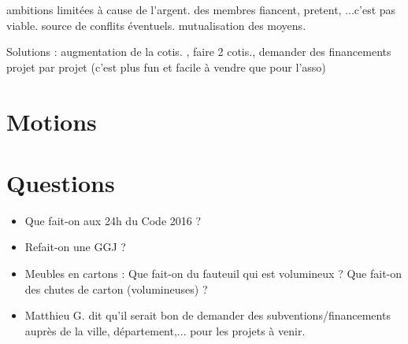 \documentclass[11pt]{article}
\begin{document}
ambitions limitées à cause de l'argent. des membres fiancent, pretent, ...c'est pas viable. source de conflits éventuels. mutualisation des moyens.

Solutions : augmentation de la cotis. , faire 2 cotis., demander des financements projet par projet (c'est plus fun et facile à vendre que pour l'asso)

\section{Motions}

\section{Questions}

\begin{itemize}
	\item Que fait-on aux 24h du Code 2016 ?
	\item Refait-on une GGJ ?
	\item Meubles en cartons : Que fait-on du fauteuil qui est volumineux ? Que fait-on des chutes de carton (volumineuses) ?
	\item Matthieu G. dit qu'il serait bon de demander des subventions/financements auprès de la ville, département,... pour les projets à venir.
\end{itemize}
\end{document}

